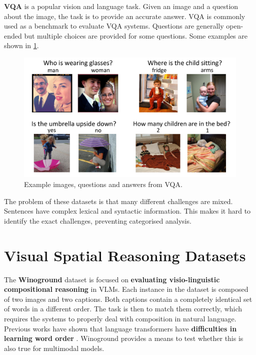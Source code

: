 \textbf{VQA} \cite{antol2015vqa} is a popular vision and language task. Given an image and a question about the image, the task is to provide an accurate answer. VQA is commonly used as a benchmark to evaluate VQA systems. Questions are generally open-ended but multiple choices are provided for some questions. Some examples are shown in \cref{fig:vqa_examples}.

\begin{figure}[ht]
    \centering
    \includegraphics[width=\linewidth]{images/datasets/vqa_examples.pdf}
    \caption{Example images, questions and answers from VQA.}
    \label{fig:vqa_examples}
\end{figure}

The problem of these datasets is that many different challenges are mixed. Sentences have complex lexical and syntactic information. This makes it hard to identify the exact challenges, preventing categorised analysis.

\section{Visual Spatial Reasoning Datasets} \label{sec:spatial_reasoning_datasets}

The \textbf{Winoground} dataset \cite{thrush2022winoground} is focused on \textbf{evaluating visio-linguistic compositional reasoning} in VLMs. Each instance in the dataset is composed of two images and two captions. Both captions contain a completely identical set of words in a different order. The task is then to match them correctly, which requires the systems to properly deal with composition in natural language. Previous works have shown that language transformers have \textbf{difficulties in learning word order} \cite{sinha2020unnatural,sinha2021matterslittle}. Winoground provides a means to test whether this is also true for multimodal models.

